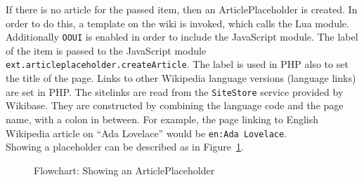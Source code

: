 If there is no article for the passed item, then an ArticlePlaceholder is created. In order to do this, a template on the wiki is invoked, which calls the Lua module. Additionally \texttt{\justify OOUI} is enabled in order to include the JavaScript module. The label of the item is passed to the JavaScript module \texttt{\justify ext.articleplaceholder.createArticle}. The label is used in PHP also to set the title of the page. Links to other Wikipedia language versions (language links) are set in PHP. The sitelinks are read from the \texttt{\justify SiteStore} service provided by Wikibase. They are constructed by combining the language code and the page name, with a colon in between. For example, the page linking to English Wikipedia article on ``Ada Lovelace'' would be \texttt{\justify en:Ada Lovelace}.\\
Showing a placeholder can be described as in Figure~\ref{fig:showpl}. 
\begin{figure}[H]
	\centering
	
	\caption{Flowchart: Showing an ArticlePlaceholder}
	\label{fig:showpl}
\end{figure}

